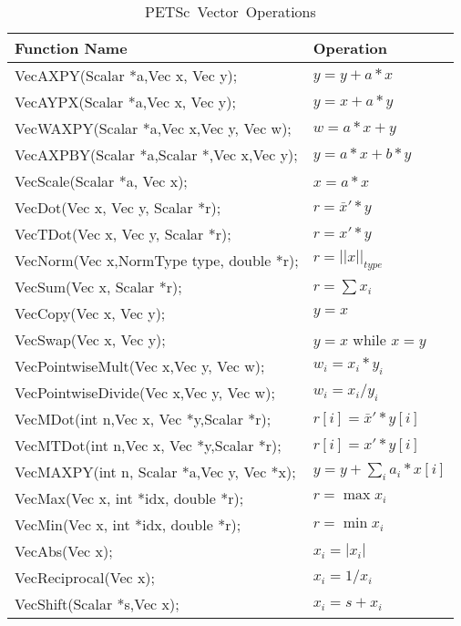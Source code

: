 \begin{table}[tb]
\begin{center}
\begin{tabular}{ll}
{\bf Function Name} & {\bf Operation} \\
\hline
VecAXPY(Scalar *a,Vec x, Vec y); & $ y = y + a*x$ \\
VecAYPX(Scalar *a,Vec x, Vec y); & $ y = x + a*y$ \\
VecWAXPY(Scalar *a,Vec x,Vec y, Vec w); & $ w = a*x + y$ \\
VecAXPBY(Scalar *a,Scalar *,Vec x,Vec y); & $ y = a*x + b*y$ \\
VecScale(Scalar *a, Vec x); & $ x = a*x $ \\
VecDot(Vec x, Vec y, Scalar *r); & $ r = \bar{x}'*y$ \\
VecTDot(Vec x, Vec y, Scalar *r); & $ r = x'*y$ \\
VecNorm(Vec x,NormType type,  double *r); & $ r = ||x||_{type}$ \\
VecSum(Vec x,   Scalar *r); & $ r = \sum x_{i}$ \\
VecCopy(Vec x, Vec y); & $ y = x $ \\
VecSwap(Vec x, Vec y); & $ y = x $ while $ x = y$ \\
VecPointwiseMult(Vec x,Vec y, Vec w); & $ w_{i} = x_{i}*y_{i} $ \\
VecPointwiseDivide(Vec x,Vec y, Vec w); & $ w_{i} = x_{i}/y_{i} $ \\
VecMDot(int n,Vec x, Vec *y,Scalar *r); & $ r[i] = \bar{x}'*y[i]$ \\
VecMTDot(int n,Vec x, Vec *y,Scalar *r); & $ r[i] = x'*y[i]$ \\
VecMAXPY(int n, Scalar *a,Vec y, Vec *x); \hspace{1cm} & $ y = y + \sum_i a_{i}*x[i] $ \\
VecMax(Vec x,  int *idx, double *r); & $ r = \max x_{i}$ \\
VecMin(Vec x,  int *idx, double *r); & $ r = \min x_{i}$ \\
VecAbs(Vec x); & $ x_i = |x_{i}|$ \\
VecReciprocal(Vec x); & $ x_i = 1/x_{i}$ \\
VecShift(Scalar *s,Vec x); & $ x_i = s + x_{i}$ \\
\hline 
\end{tabular}
\end{center}
\caption{\hbox{PETSc Vector Operations}}
\label{fig:vectorops}
\end{table}

